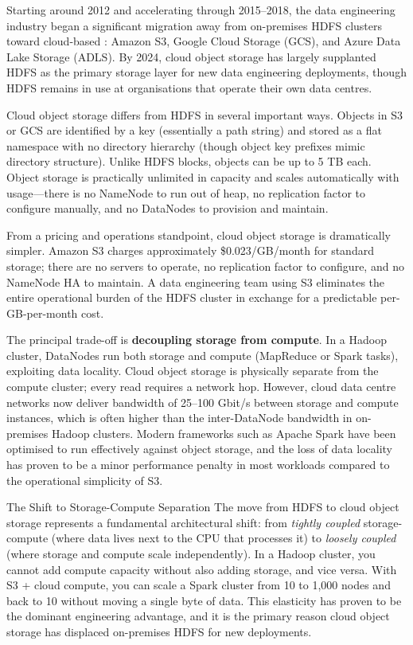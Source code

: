 Starting around 2012 and accelerating through 2015--2018, the data
engineering industry began a significant migration away from
on-premises HDFS clusters toward cloud-based :
Amazon S3, Google Cloud Storage (GCS), and Azure Data Lake Storage
(ADLS). By 2024, cloud object storage has largely supplanted HDFS as
the primary storage layer for new data engineering deployments, though
HDFS remains in use at organisations that operate their own data
centres.

Cloud object storage differs from HDFS in several important ways.
Objects in S3 or GCS are identified by a key (essentially a path
string) and stored as a flat namespace with no directory hierarchy
(though object key prefixes mimic directory structure). Unlike HDFS
blocks, objects can be up to 5 TB each. Object storage is practically
unlimited in capacity and scales automatically with usage---there is
no NameNode to run out of heap, no replication factor to configure
manually, and no DataNodes to provision and maintain.

From a pricing and operations standpoint, cloud object storage is
dramatically simpler. Amazon S3 charges approximately \$0.023/GB/month
for standard storage; there are no servers to operate, no replication
factor to configure, and no NameNode HA to maintain. A data engineering
team using S3 eliminates the entire operational burden of the HDFS
cluster in exchange for a predictable per-GB-per-month cost.

The principal trade-off is \textbf{decoupling storage from compute}.
In a Hadoop cluster, DataNodes run both storage and compute (MapReduce
or Spark tasks), exploiting data locality. Cloud object storage is
physically separate from the compute cluster; every read requires a
network hop. However, cloud data centre networks now deliver bandwidth
of 25--100 Gbit/s between storage and compute instances, which is
often higher than the inter-DataNode bandwidth in on-premises
Hadoop clusters. Modern frameworks such as Apache Spark have been
optimised to run effectively against object storage, and the loss of
data locality has proven to be a minor performance penalty in most
workloads compared to the operational simplicity of S3.

\begin{keyinsight}{The Shift to Storage-Compute Separation}
The move from HDFS to cloud object storage represents a fundamental
architectural shift: from \emph{tightly coupled} storage-compute
(where data lives next to the CPU that processes it) to \emph{loosely
coupled} (where storage and compute scale independently). In a Hadoop
cluster, you cannot add compute capacity without also adding storage,
and vice versa. With S3 + cloud compute, you can scale a Spark cluster
from 10 to 1,000 nodes and back to 10 without moving a single byte
of data. This elasticity has proven to be the dominant engineering
advantage, and it is the primary reason cloud object storage has
displaced on-premises HDFS for new deployments.
\end{keyinsight}


